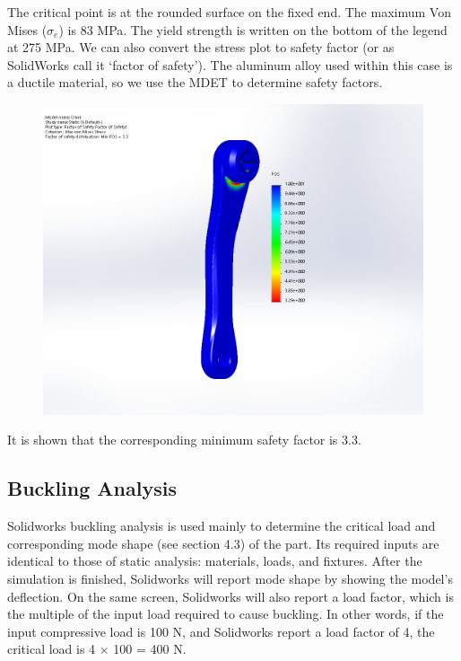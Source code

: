 \documentclass[
10pt,
a4paper,
openany,
svgnames,
]{book}
\begin{document}
\begin{solution}
The critical point is at the rounded surface on the fixed end. The maximum Von Mises ($\sigma_e$) is 83 MPa. The yield strength is written on the bottom of the legend at 275 MPa. We can also convert the stress plot to safety factor (or as SolidWorks call it `factor of safety'). The aluminum alloy used within this case is a ductile material, so we use the MDET to determine safety factors.

\begin{figure}[H]
  \centering
  \includegraphics[scale=0.4]{pictures/Intro-CAD/Crank-safety-factor}
\end{figure}

It is shown that the corresponding minimum safety factor is 3.3.
\end{solution}

\subsection{Buckling Analysis}

Solidworks buckling analysis is used mainly to determine the critical load and corresponding mode shape (see section 4.3) of the part. Its required inputs are identical to those of static analysis: materials, loads, and fixtures. After the simulation is finished, Solidworks will report mode shape by showing the model’s deflection. On the same screen, Solidworks will also report a load factor, which is the multiple of the input load required to cause buckling. In other words, if the input compressive load is 100 N, and Solidworks report a load factor of 4, the critical load is 4 $\times$ 100 = 400 N.
\end{document}
